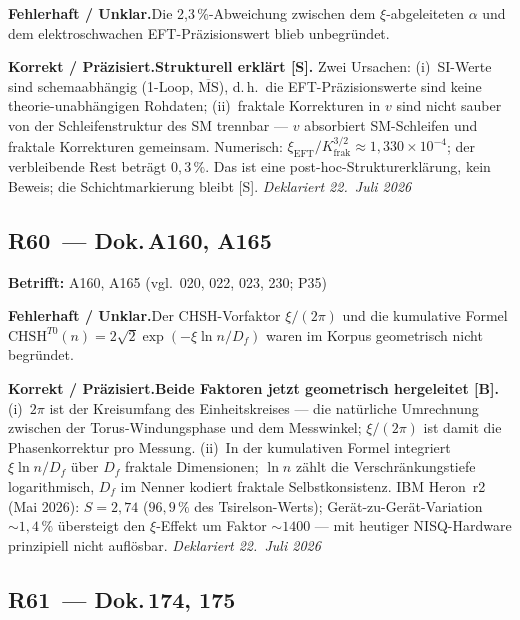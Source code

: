 \smallskip\noindent\textbf{Fehlerhaft / Unklar.}\quad Die 2,3\,\%-Abweichung zwischen dem $\xi$-abgeleiteten $\alpha$ und dem elektroschwachen EFT-Präzisionswert blieb unbegründet.


\smallskip\noindent\textbf{Korrekt / Präzisiert.}\quad \textbf{Strukturell erklärt [S].} Zwei Ursachen: (i)~SI-Werte sind schemaabhängig (1-Loop, $\overline{\mathrm{MS}}$), d.\,h.\ die EFT-Präzisionswerte sind keine theorie-unabhängigen Rohdaten; (ii)~fraktale Korrekturen in $v$ sind nicht sauber von der Schleifenstruktur des SM trennbar --- $v$ absorbiert SM-Schleifen und fraktale Korrekturen gemeinsam. Numerisch: $\xi_\text{EFT}/K_\text{frak}^{3/2}\approx1{,}330\times10^{-4}$; der verbleibende Rest beträgt $0{,}3\,\%$. Das ist eine post-hoc-Strukturerklärung, kein Beweis; die Schichtmarkierung bleibt [S]. \emph{Deklariert 22.~Juli 2026}


\medskip


\subsection*{R60~--- Dok.\,A160, A165}

\noindent\textbf{Betrifft:} A160, A165 (vgl.\ 020, 022, 023, 230; P35)


\smallskip\noindent\textbf{Fehlerhaft / Unklar.}\quad Der CHSH-Vorfaktor $\xi/(2\pi)$ und die kumulative Formel $\text{CHSH}^{T0}(n)=2\sqrt{2}\exp(-\xi\ln n/D_f)$ waren im Korpus geometrisch nicht begründet.


\smallskip\noindent\textbf{Korrekt / Präzisiert.}\quad \textbf{Beide Faktoren jetzt geometrisch hergeleitet [B].} (i)~$2\pi$ ist der Kreisumfang des Einheitskreises --- die natürliche Umrechnung zwischen der Torus-Windungsphase und dem Messwinkel; $\xi/(2\pi)$ ist damit die Phasenkorrektur pro Messung. (ii)~In der kumulativen Formel integriert $\xi\ln n/D_f$ über $D_f$ fraktale Dimensionen; $\ln n$ zählt die Verschränkungstiefe logarithmisch, $D_f$ im Nenner kodiert fraktale Selbstkonsistenz. IBM Heron~r2 (Mai 2026): $S=2{,}74$ ($96{,}9\,\%$ des Tsirelson-Werts); Gerät-zu-Gerät-Variation $\sim1{,}4\,\%$ übersteigt den $\xi$-Effekt um Faktor $\sim1400$ --- mit heutiger NISQ-Hardware prinzipiell nicht auflösbar. \emph{Deklariert 22.~Juli 2026}


\medskip


\subsection*{R61~--- Dok.\,174, 175}

